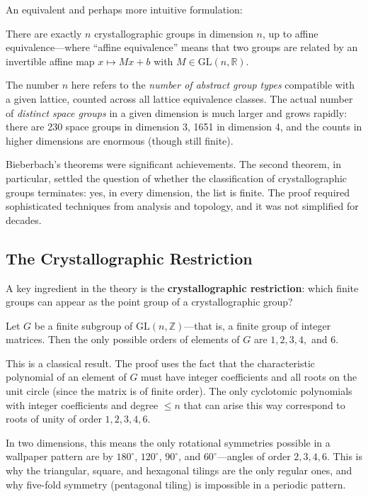 An equivalent and perhaps more intuitive formulation:

\begin{corollary}\label{cor:bieberbach-finite}
There are exactly $n$ crystallographic groups in dimension $n$, up to affine equivalence---where ``affine equivalence'' means that two groups are related by an invertible affine map $x \mapsto Mx + b$ with $M \in \mathrm{GL}(n, \mathbb{R})$.
\end{corollary}

The number $n$ here refers to the \emph{number of abstract group types} compatible with a given lattice, counted across all lattice equivalence classes. The actual number of \emph{distinct space groups} in a given dimension is much larger and grows rapidly: there are 230 space groups in dimension 3, 1651 in dimension 4, and the counts in higher dimensions are enormous (though still finite).

Bieberbach's theorems were significant achievements. The second theorem, in particular, settled the question of whether the classification of crystallographic groups terminates: yes, in every dimension, the list is finite. The proof required sophisticated techniques from analysis and topology, and it was not simplified for decades.

\subsection{The Crystallographic Restriction}

A key ingredient in the theory is the \textbf{crystallographic restriction}: which finite groups can appear as the point group of a crystallographic group?

\begin{theorem}\label{thm:crystallographic-restriction}
Let $G$ be a finite subgroup of $\mathrm{GL}(n, \mathbb{Z})$---that is, a finite group of integer matrices. Then the only possible orders of elements of $G$ are $1, 2, 3, 4,$ and $6$.
\end{theorem}

This is a classical result. The proof uses the fact that the characteristic polynomial of an element of $G$ must have integer coefficients and all roots on the unit circle (since the matrix is of finite order). The only cyclotomic polynomials with integer coefficients and degree $\leq n$ that can arise this way correspond to roots of unity of order $1, 2, 3, 4, 6$.

In two dimensions, this means the only rotational symmetries possible in a wallpaper pattern are by $180^\circ$, $120^\circ$, $90^\circ$, and $60^\circ$---angles of order $2, 3, 4, 6$. This is why the triangular, square, and hexagonal tilings are the only regular ones, and why five-fold symmetry (pentagonal tiling) is impossible in a periodic pattern.

